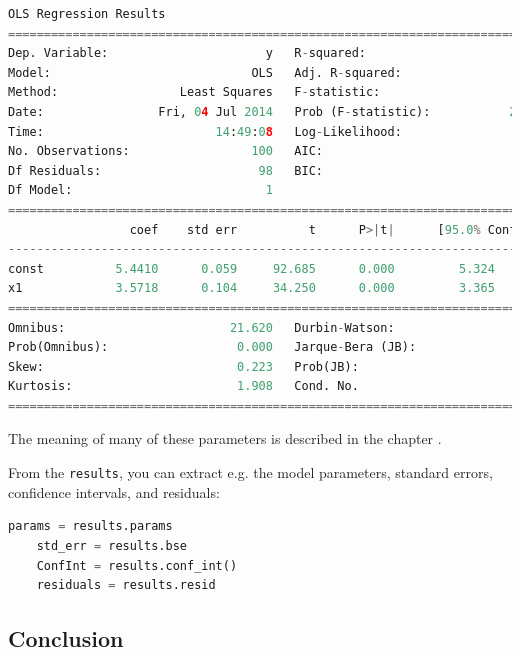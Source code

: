 \begin{lstlisting}[language=Python]
                            OLS Regression Results
==============================================================================
Dep. Variable:                      y   R-squared:                       0.923
Model:                            OLS   Adj. R-squared:                  0.922
Method:                 Least Squares   F-statistic:                     1173.
Date:                Fri, 04 Jul 2014   Prob (F-statistic):           2.45e-56
Time:                        14:49:08   Log-Likelihood:                -15.390
No. Observations:                 100   AIC:                             34.78
Df Residuals:                      98   BIC:                             39.99
Df Model:                           1
==============================================================================
                 coef    std err          t      P>|t|      [95.0% Conf. Int.]
------------------------------------------------------------------------------
const          5.4410      0.059     92.685      0.000         5.324     5.557
x1             3.5718      0.104     34.250      0.000         3.365     3.779
==============================================================================
Omnibus:                       21.620   Durbin-Watson:                   2.302
Prob(Omnibus):                  0.000   Jarque-Bera (JB):                5.798
Skew:                           0.223   Prob(JB):                       0.0551
Kurtosis:                       1.908   Cond. No.                         4.60
==============================================================================
\end{lstlisting}

The meaning of many of these parameters is described in the chapter .

From the \texttt{results}, you can extract e.g. the model parameters, standard errors, confidence intervals, and residuals:

\begin{lstlisting}[language=Python]
    params = results.params
    std_err = results.bse
    ConfInt = results.conf_int()
    residuals = results.resid
\end{lstlisting}



\subsection{Conclusion}


